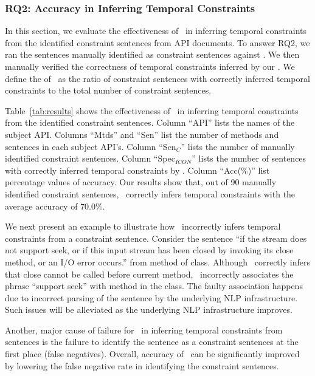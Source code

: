\subsubsection{RQ2: Accuracy in Inferring Temporal Constraints}

In this section, we evaluate the effectiveness of \tool\ in inferring temporal constraints from the identified constraint sentences from API documents. To answer RQ2, we ran the sentences manually identified as constraint sentences against \tool. We then manually verified the correctness of temporal constraints inferred by our \tool. We define the  of \tool\ as the ratio of constraint sentences with correctly inferred temporal constraints to the total number of constraint sentences. 

Table~\ref{tab:results} shows the effectiveness of \tool\ in inferring temporal constraints from the identified constraint sentences.
Column ``API'' lists the names of the subject API. 
Columns ``Mtds'' and ``Sen'' list the number of methods and sentences in each subject API's.
Column ``Sen$_C$'' lists the number of manually identified constraint sentences.
Column ``Spec$_{ICON}$'' lists the number of sentences with correctly inferred temporal constraints by \tool. 
Column ``Acc(\%)'' list percentage values of accuracy. 
Our results show that, out of 90 manually identified constraint sentences, \tool\ correctly infers temporal constraints with the average accuracy of 70.0\%.

We next present an example to illustrate how \tool\ incorrectly infers temporal constraints from a constraint sentence. Consider the sentence ``if the stream does not support seek, or if this input stream has been closed by invoking its close method, or an I/O error occurs.'' from  method of  class. Although \tool\ correctly infers that close cannot be called before current method, \tool\ incorrectly associates the phrase ``support seek'' with method  in the class. The faulty association happens due to incorrect parsing of the sentence by the underlying NLP infrastructure. Such issues will be alleviated as the underlying NLP infrastructure improves.   

Another, major cause of failure for \tool\ in inferring temporal constraints from sentences is the failure to identify the sentence as a constraint sentences at the first place (false negatives). Overall, accuracy of \tool\ can be significantly improved by lowering the false negative rate in identifying the constraint sentences. 




